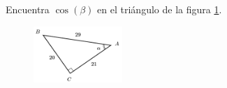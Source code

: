 \question[15] Encuentra $\cos(\beta)$ en el triángulo de la figura \ref{fig:functrig11}.
\begin{figure}[H]
    \begin{center}
        \includegraphics[width=0.3\textwidth]{../images/functrig11.png}
    \end{center}
    \caption{}
    \label{fig:functrig11}
\end{figure}
